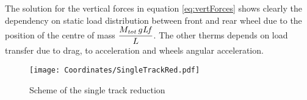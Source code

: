 The solution for the vertical forces in equation \ref{eq:vertForces} shows clearly the dependency on static load distribution between front and rear wheel due to the position of the centre of mass $\displaystyle{\frac {M_{{\it tot}}\,g{\it Lf}}{L}}$. The other therms depends on load transfer due to drag, to acceleration and wheels angular acceleration.\\
%
\begin{figure}[htb]
    \centering
    \texttt{[image: Coordinates/SingleTrackRed.pdf]}
    \caption{Scheme of the single track reduction}
    \label{fig:SigngleTrackRed}
\end{figure}